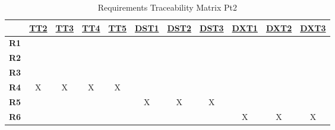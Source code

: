\documentclass[12pt, titlepage]{article}
\begin{document}
\begin{table}[H]
  \centering
  \begin{tabular}{|c|c|c|c|c|c|c|c|c|c|c|}
    \hline
                & \hyperref[TT2]{TT2} & \hyperref[TT3]{TT3} & \hyperref[TT4]{TT4} & \hyperref[TT5]{TT5} & \hyperref[DST1]{DST1} & \hyperref[DST2]{DST2} & \hyperref[DST3]{DST3} & \hyperref[DXT1]{DXT1} & \hyperref[DXT2]{DXT2} & \hyperref[DXT3]{DXT3} \\
    \hline
    \textbf{R1} &                     &                     &                     &                     &                       &                       &                       &                       &                       &                       \\ \hline
    \textbf{R2} &                     &                     &                     &                     &                       &                       &                       &                       &                       &                       \\ \hline
    \textbf{R3} &                     &                     &                     &                     &                       &                       &                       &                       &                       &                       \\ \hline
    \textbf{R4} & X                   & X                   & X                   & X                   &                       &                       &                       &                       &                       &                       \\ \hline
    \textbf{R5} &                     &                     &                     &                     & X                     & X                     & X                     &                       &                       &                       \\ \hline
    \textbf{R6} &                     &                     &                     &                     &                       &                       &                       & X                     & X                     & X                     \\ \hline
  \end{tabular}
  \caption{Requirements Traceability Matrix Pt2}
  \label{Table:B_Req_trace}
\end{table}
\end{document}
